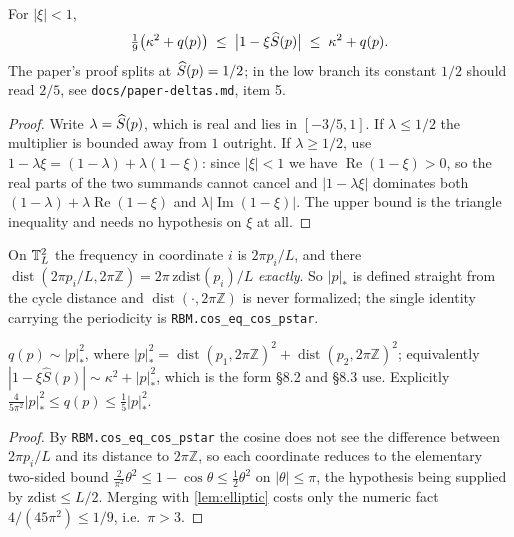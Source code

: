 \begin{lemma}\label{lem:elliptic}
  \leanok
  For $|\xi|<1$,
  \[ \tfrac19\big(\kappa^2+q(p)\big)\;\le\;\big|1-\xi\widehat{S}(p)\big|\;\le\;\kappa^2+q(p). \]
  The paper's proof splits at $\widehat{S}(p)=1/2$; in the low branch its constant
  $1/2$ should read $2/5$, see \texttt{docs/paper-deltas.md}, item 5.
\end{lemma}
\begin{proof}\leanok
  Write $\lambda=\widehat{S}(p)$, which is real and lies in $[-3/5,1]$.  If
  $\lambda\le1/2$ the multiplier is bounded away from $1$ outright.  If
  $\lambda\ge1/2$, use $1-\lambda\xi=(1-\lambda)+\lambda(1-\xi)$: since
  $|\xi|<1$ we have $\operatorname{Re}(1-\xi)>0$, so the real parts of the two
  summands cannot cancel and $|1-\lambda\xi|$ dominates both
  $(1-\lambda)+\lambda\operatorname{Re}(1-\xi)$ and
  $\lambda|\operatorname{Im}(1-\xi)|$.  The upper bound is the triangle
  inequality and needs no hypothesis on $\xi$ at all.
\end{proof}

\begin{definition}\label{def:pstar}
  \leanok
  On $\mathbb{T}_L^2$ the frequency in coordinate $i$ is $2\pi p_i/L$, and there
  $\operatorname{dist}(2\pi p_i/L,2\pi\mathbb Z)=2\pi\,\mathrm{zdist}(p_i)/L$
  \emph{exactly}.  So $|p|_*$ is defined straight from the cycle distance and
  $\operatorname{dist}(\cdot,2\pi\mathbb Z)$ is never formalized; the single
  identity carrying the periodicity is \texttt{RBM.cos\_eq\_cos\_pstar}.
\end{definition}

\begin{lemma}\label{lem:qcomp}
  \leanok
  $q(p)\sim|p|_*^2$, where $|p|_*^2=\operatorname{dist}(p_1,2\pi\mathbb Z)^2
  +\operatorname{dist}(p_2,2\pi\mathbb Z)^2$; equivalently
  $|1-\xi\widehat S(p)|\sim\kappa^2+|p|_*^2$, which is the form \S8.2 and \S8.3 use.
  Explicitly $\tfrac{4}{5\pi^2}|p|_*^2\le q(p)\le\tfrac15|p|_*^2$.
\end{lemma}
\begin{proof}\leanok
  By \texttt{RBM.cos\_eq\_cos\_pstar} the cosine does not see the difference
  between $2\pi p_i/L$ and its distance to $2\pi\mathbb Z$, so each coordinate
  reduces to the elementary two-sided bound
  $\tfrac{2}{\pi^2}\theta^2\le1-\cos\theta\le\tfrac12\theta^2$ on $|\theta|\le\pi$,
  the hypothesis being supplied by $\mathrm{zdist}\le L/2$.  Merging with
  \eqref{lem:elliptic} costs only the numeric fact $4/(45\pi^2)\le1/9$, i.e.\ $\pi>3$.
\end{proof}

